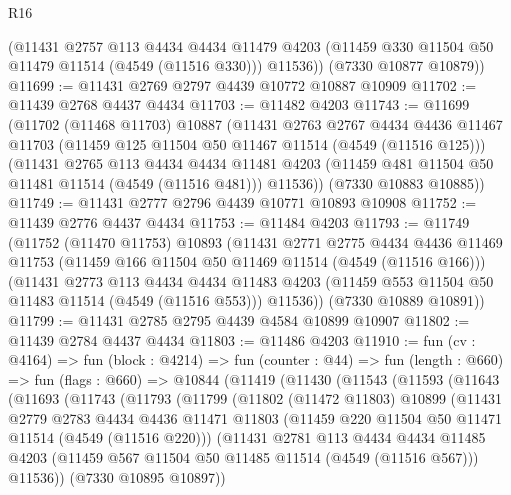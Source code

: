 \begin{lexlean}{R16}
\begin{coremodule}
        (@11431
          @2757
          @113
          @4434
          @4434
          @11479
          @4203
          (@11459 @330 @11504 @50 @11479 @11514 (@4549 (@11516 @330)))
          @11536))
      (@7330 @10877 @10879))
@11699 := @11431 @2769 @2797 @4439 @10772 @10887 @10909
@11702 := @11439 @2768 @4437 @4434
@11703 := @11482 @4203
@11743 := @11699
    (@11702
      (@11468 @11703)
      @10887
      (@11431
        @2763
        @2767
        @4434
        @4436
        @11467
        @11703
        (@11459 @125 @11504 @50 @11467 @11514 (@4549 (@11516 @125)))
        (@11431
          @2765
          @113
          @4434
          @4434
          @11481
          @4203
          (@11459 @481 @11504 @50 @11481 @11514 (@4549 (@11516 @481)))
          @11536))
      (@7330 @10883 @10885))
@11749 := @11431 @2777 @2796 @4439 @10771 @10893 @10908
@11752 := @11439 @2776 @4437 @4434
@11753 := @11484 @4203
@11793 := @11749
    (@11752
      (@11470 @11753)
      @10893
      (@11431
        @2771
        @2775
        @4434
        @4436
        @11469
        @11753
        (@11459 @166 @11504 @50 @11469 @11514 (@4549 (@11516 @166)))
        (@11431
          @2773
          @113
          @4434
          @4434
          @11483
          @4203
          (@11459 @553 @11504 @50 @11483 @11514 (@4549 (@11516 @553)))
          @11536))
      (@7330 @10889 @10891))
@11799 := @11431 @2785 @2795 @4439 @4584 @10899 @10907
@11802 := @11439 @2784 @4437 @4434
@11803 := @11486 @4203
@11910 := fun (cv : @4164) =>
  fun (block : @4214) =>
  fun (counter : @44) =>
  fun (length : @660) =>
  fun (flags : @660) =>
  @10844
    (@11419
      (@11430
        (@11543
          (@11593
            (@11643
              (@11693
                (@11743
                  (@11793
                    (@11799
                      (@11802
                        (@11472 @11803)
                        @10899
                        (@11431
                          @2779
                          @2783
                          @4434
                          @4436
                          @11471
                          @11803
                          (@11459 @220 @11504 @50 @11471 @11514 (@4549 (@11516 @220)))
                          (@11431
                            @2781
                            @113
                            @4434
                            @4434
                            @11485
                            @4203
                            (@11459 @567 @11504 @50 @11485 @11514 (@4549 (@11516 @567)))
                            @11536))
                        (@7330 @10895 @10897))

\end{coremodule}
\end{lexlean}

